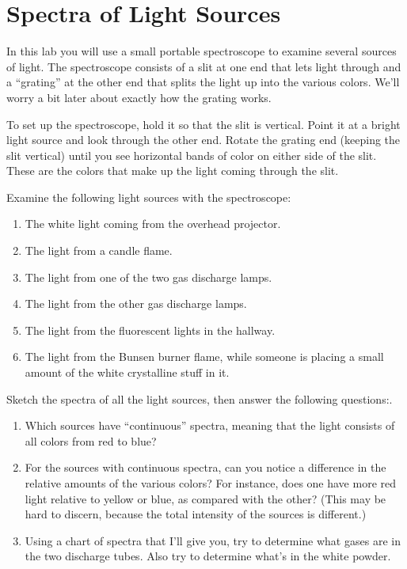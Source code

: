 \chapter{Spectra of Light Sources}

\bigskip\bigskip

In this lab 
you will use a small portable spectroscope to examine several sources
of light.  The spectroscope consists of a slit at one end that lets
light through and a ``grating'' at the other end that splits the light
up into the various colors.  We'll worry a bit later about exactly
how the grating works.

To set up the spectroscope, hold it so that the slit is vertical.  Point
it at a bright light source and look through the other end.  Rotate
the grating end (keeping the slit vertical) until you see horizontal
bands of color on either side of the slit.  These are the colors that
make up the light coming through the slit.

Examine the following light sources with the spectroscope:

\begin{enumerate}

\item The white light coming from the overhead projector.
\item The light from a candle flame.
\item The light from one of the two gas discharge lamps.
\item The light from the other gas discharge lamps.
\item The light from the fluorescent lights in the hallway.
\item The light from the Bunsen burner flame, while someone is placing
a small amount of the white crystalline stuff in it.

\end{enumerate}

Sketch the spectra of all the light sources, then
answer the following questions:.


\begin{enumerate}
\item Which sources have ``continuous'' spectra, meaning that the
light consists of all colors from red to blue?

\vskip 1in

\item For the sources with continuous spectra, can you notice
a difference in the relative amounts of the various colors?
For instance, does one have more red light relative to yellow
or blue, as compared with the other?  (This may be hard to discern,
because the total intensity of the sources is different.)

\vskip 1in

\item Using a chart of spectra that I'll give you, try to determine what gases
are in the two discharge tubes.  Also try to determine
what's in the white powder.

\vskip 1in

\end{enumerate}

